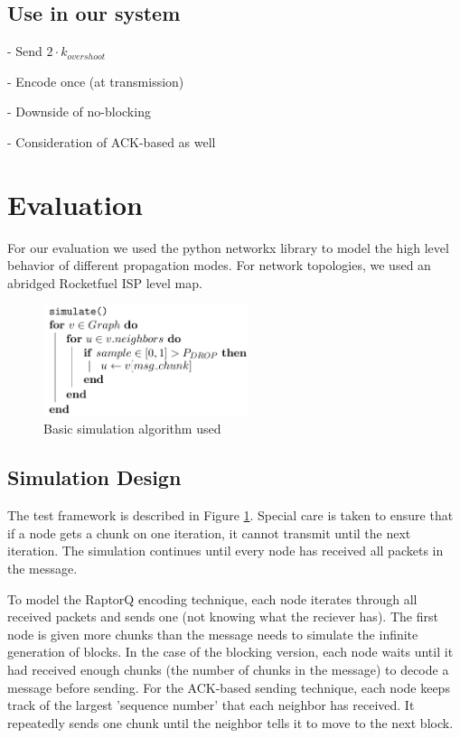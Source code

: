 \subsection{Use in our system}
-   Send  $2\cdot k_{overshoot}$

-   Encode once (at transmission)

-   Downside of no-blocking

- Consideration of ACK-based as well


\section{Evaluation}
For our evaluation we used the python networkx library to model the high level behavior of different propagation modes.\cite{nwx}
For network topologies, we used an abridged Rocketfuel ISP level map. \cite{rocketfuel}

\begin{figure}[tp]
\centering
\includegraphics[width=6cm]{figures/simulate_algo.png}
\caption{Basic simulation algorithm used}
\label{algo:a1}
\end{figure}

\subsection{Simulation Design}
The test framework is described in Figure \ref{algo:a1}. Special care is taken to ensure that if a node gets a chunk on one iteration, it cannot transmit until the next iteration. The simulation continues until every node has received all packets in the message.  

To model the RaptorQ encoding technique, each node iterates through all received packets and sends one (not knowing what the reciever has). The first node is given more chunks than the message needs to simulate the infinite generation of blocks. In the case of the blocking version, each node waits until it had received enough chunks (the number of chunks in the message) to decode a message before sending. For the ACK-based sending technique, each node keeps track of the largest 'sequence number' that each neighbor has received. It repeatedly sends one chunk until the neighbor tells it to move to the next block.

